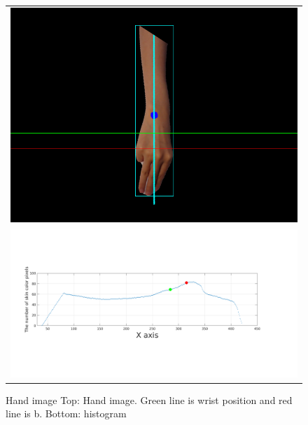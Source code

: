 \begin{figure}
 \centering
 \begin{tabular}{c}
  \includegraphics[width=\hsize]{fig6/im.png} \\
  \includegraphics[width=\hsize]{fig6/hist.png}
 \end{tabular}
 \caption{Hand image Top: Hand image. Green line is wrist position and red line is b. Bottom: histogram}
 \label{fig:handim2}
\end{figure}

